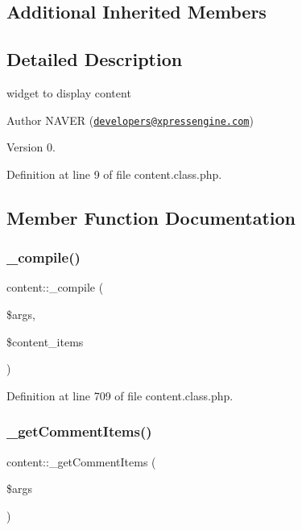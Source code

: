 \subsection*{Additional Inherited Members}


\subsection{Detailed Description}
widget to display content 

\begin{DoxyAuthor}{Author}
N\+A\+V\+ER (\href{mailto:developers@xpressengine.com}{\tt developers@xpressengine.\+com}) 
\end{DoxyAuthor}
\begin{DoxyVersion}{Version}
0. 
\end{DoxyVersion}


Definition at line 9 of file content.\+class.\+php.



\subsection{Member Function Documentation}
\mbox{\label{classcontent_a297e1dd4d257abab532a9a9d99847ee8}} 
\subsubsection{\texorpdfstring{\+\_\+compile()}{\_compile()}}
{\footnotesize\ttfamily content\+::\+\_\+compile (\begin{DoxyParamCaption}\item[{}]{\$args,  }\item[{}]{\$content\+\_\+items }\end{DoxyParamCaption})}



Definition at line 709 of file content.\+class.\+php.

\mbox{\label{classcontent_a257f112a3719c28356bd49c336d3ad2f}} 
\subsubsection{\texorpdfstring{\+\_\+get\+Comment\+Items()}{\_getCommentItems()}}
{\footnotesize\ttfamily content\+::\+\_\+get\+Comment\+Items (\begin{DoxyParamCaption}\item[{}]{\$args }\end{DoxyParamCaption})}



